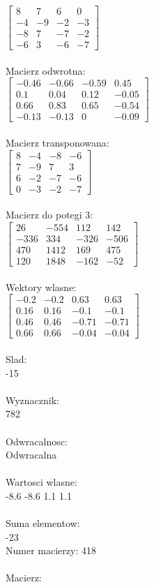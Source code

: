 \documentclass[a4paper,12pt]{article}
\begin{document}
$\begin{bmatrix} 8&7&6&0\\-4&-9&-2&-3\\-8&7&-7&-2\\-6&3&-6&-7 \end{bmatrix}$
\\
\\
Macierz odwrotna:\\

$\begin{bmatrix} -0.46&-0.66&-0.59&0.45\\0.1&0.04&0.12&-0.05\\0.66&0.83&0.65&-0.54\\-0.13&-0.13&0&-0.09 \end{bmatrix}$
\\
\\
Macierz transponowana:\\

$\begin{bmatrix} 8&-4&-8&-6\\7&-9&7&3\\6&-2&-7&-6\\0&-3&-2&-7 \end{bmatrix}$
\\
\\
Macierz do potegi 3:\\

$\begin{bmatrix} 26&-554&112&142\\-336&334&-326&-506\\470&1412&169&475\\120&1848&-162&-52 \end{bmatrix}$
\\
\\
Wektory wlasne:\\

$\begin{bmatrix} -0.2&-0.2&0.63&0.63\\0.16&0.16&-0.1&-0.1\\0.46&0.46&-0.71&-0.71\\0.66&0.66&-0.04&-0.04 \end{bmatrix}$
\\
\\
Slad:\\
-15
\\
\\
Wyznacznik:\\
782
\\
\\
Odwracalnosc:\\
Odwracalna
\\
\\
Wartosci wlasne:\\
-8.6 -8.6 1.1 1.1
\\
\\
Suma elementow:\\
-23
\\
\newpage
Numer macierzy:
418
\\
\\
Macierz:\\
\end{document}
